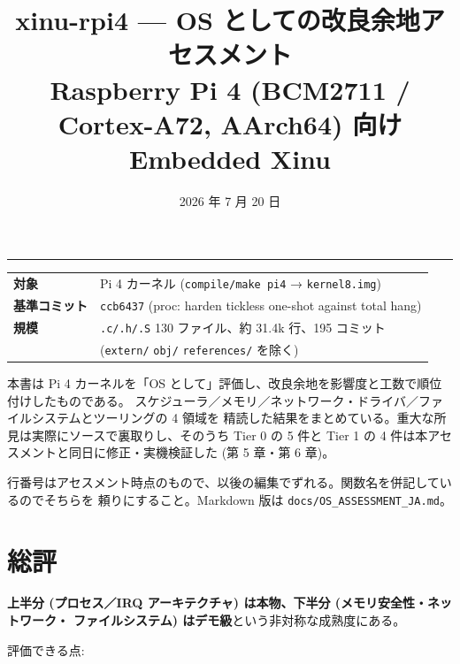 \documentclass[a4paper,11pt]{ltjsarticle}
\title{\textbf{xinu-rpi4 --- OS としての改良余地アセスメント}\\[3pt]
       \large Raspberry Pi 4 (BCM2711 / Cortex-A72, AArch64) 向け Embedded Xinu}
\author{}
\date{2026 年 7 月 20 日}
\begin{document}
\maketitle
\vspace{-2.0em}
\begin{center}\rule{0.9\textwidth}{0.4pt}\end{center}

\begin{center}\small
\begin{tabular}{@{}ll@{}}
\toprule
\textbf{対象} & Pi 4 カーネル (\texttt{compile/make pi4} → \texttt{kernel8.img})\\
\textbf{基準コミット} & \texttt{ccb6437} (proc: harden tickless one-shot against total hang)\\
\textbf{規模} & \texttt{.c/.h/.S} 130 ファイル、約 31.4k 行、195 コミット\\
              & (\texttt{extern/} \texttt{obj/} \texttt{references/} を除く)\\
\bottomrule
\end{tabular}
\end{center}

\bigskip

本書は Pi 4 カーネルを「OS として」評価し、改良余地を影響度と工数で順位付けしたものである。
スケジューラ／メモリ／ネットワーク・ドライバ／ファイルシステムとツーリングの 4 領域を
精読した結果をまとめている。重大な所見は実際にソースで裏取りし、そのうち Tier 0 の 5 件と
Tier 1 の 4 件は本アセスメントと同日に修正・実機検証した (第 5 章・第 6 章)。

行番号はアセスメント時点のもので、以後の編集でずれる。関数名を併記しているのでそちらを
頼りにすること。Markdown 版は \texttt{docs/OS\_ASSESSMENT\_JA.md}。

{\small\tableofcontents}
\bigskip

\section{総評}

\textbf{上半分 (プロセス／IRQ アーキテクチャ) は本物、下半分 (メモリ安全性・ネットワーク・
ファイルシステム) はデモ級}という非対称な成熟度にある。

評価できる点:
\end{document}
